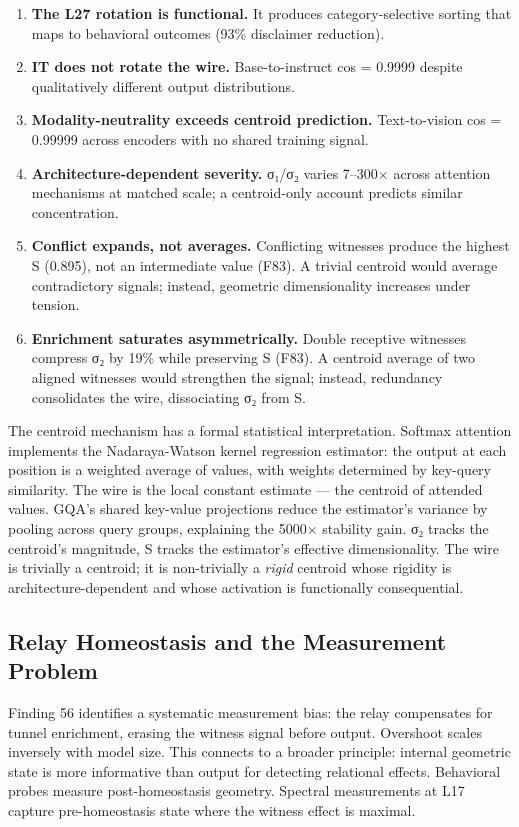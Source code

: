 \documentclass[12pt]{article}
\begin{document}
\begin{enumerate}
\item \textbf{The L27 rotation is functional.} It produces category-selective sorting that maps to behavioral outcomes (93\% disclaimer reduction).
\item \textbf{IT does not rotate the wire.} Base-to-instruct cos = 0.9999 despite qualitatively different output distributions.
\item \textbf{Modality-neutrality exceeds centroid prediction.} Text-to-vision cos = 0.99999 across encoders with no shared training signal.
\item \textbf{Architecture-dependent severity.} σ₁/σ₂ varies 7–300× across attention mechanisms at matched scale; a centroid-only account predicts similar concentration.
\item \textbf{Conflict expands, not averages.} Conflicting witnesses produce the highest S (0.895), not an intermediate value (F83). A trivial centroid would average contradictory signals; instead, geometric dimensionality increases under tension.
\item \textbf{Enrichment saturates asymmetrically.} Double receptive witnesses compress σ₂ by 19\% while preserving S (F83). A centroid average of two aligned witnesses would strengthen the signal; instead, redundancy consolidates the wire, dissociating σ₂ from S.
\end{enumerate}

The centroid mechanism has a formal statistical interpretation. Softmax attention implements the Nadaraya-Watson kernel regression estimator: the output at each position is a weighted average of values, with weights determined by key-query similarity. The wire is the local constant estimate — the centroid of attended values. GQA's shared key-value projections reduce the estimator's variance by pooling across query groups, explaining the 5000× stability gain. σ₂ tracks the centroid's magnitude, S tracks the estimator's effective dimensionality. The wire is trivially a centroid; it is non-trivially a \textit{rigid} centroid whose rigidity is architecture-dependent and whose activation is functionally consequential.

\subsection{Relay Homeostasis and the Measurement Problem}

Finding 56 identifies a systematic measurement bias: the relay compensates for tunnel enrichment, erasing the witness signal before output. Overshoot scales inversely with model size. This connects to a broader principle: internal geometric state is more informative than output for detecting relational effects. Behavioral probes measure post-homeostasis geometry. Spectral measurements at L17 capture pre-homeostasis state where the witness effect is maximal.
\end{document}
